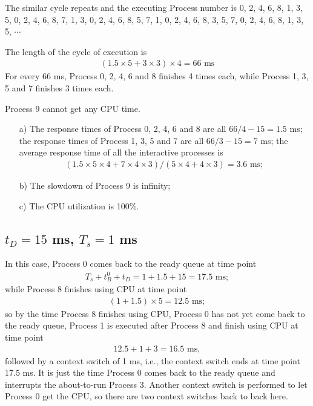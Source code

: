\documentclass[12pt,letterpaper]{article}
\begin{document}
The similar cycle repeats and the executing Process number is 0, 2, 4, 6, 8, 1, 3, 5, 0, 2, 4, 6, 8, 7, 1, 3, 0, 2, 4, 6, 8, 5, 7, 1, 0, 2, 4, 6, 8, 3, 5, 7, 0, 2, 4, 6, 8, 1, 3, 5, $\cdots$

The length of the cycle of execution is 
\begin{eqnarray}
(1.5\times5+3\times3)\times4=66\textrm{ ms}
\end{eqnarray}
For every 66 ms, Process 0, 2, 4, 6 and 8 finishes 4 times each, while Process 1, 3, 5 and 7 finishes 3 times each.

Process 9 cannot get any CPU time.

\begin{enumerate}
\item[a)] The response times of Process 0, 2, 4, 6 and 8 are all $66/4-15=1.5$ ms;
the response times of Process 1, 3, 5 and 7 are all $66/3-15=7$ ms;
the average response time of all the interactive processes is 
\begin{eqnarray}
(1.5\times5\times4+7\times4\times3)/(5\times4+4\times3)=3.6\textrm{ ms};
\end{eqnarray}
\item[b)] The slowdown of Process 9 is infinity;
\item[c)] The CPU utilization is 100\%.
\end{enumerate}

\subsection{$t_D=15$ ms, $T_s = 1$ ms}
In this case, Process 0 comes back to the ready queue at time point
\begin{eqnarray}
T_s+t_B^0+t_D=1+1.5+15=17.5\textrm{ ms};
\end{eqnarray}
while Process 8 finishes using CPU at time point 
\begin{eqnarray}
(1+1.5)\times5=12.5\textrm{ ms};
\end{eqnarray}
so by the time Process 8 finishes using CPU, Process 0 has not yet come back to the ready queue, Process 1 is executed after Process 8 and finish using CPU at time point 
\begin{eqnarray}
12.5+1+3=16.5\textrm{ ms},
\end{eqnarray}
followed by a context switch of 1 ms, i.e., the context switch ends at time point 17.5 ms. It is just the time Process 0 comes back to the ready queue and interrupts the about-to-run Process 3. Another context switch is performed to let Process 0 get the CPU, so there are two context switches back to back here. 
\end{document}
